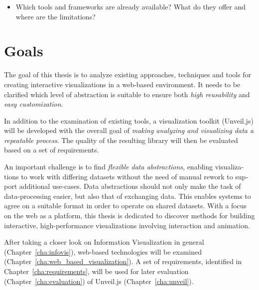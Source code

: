 \begin{english}
\begin{itemize}
  \item Which tools and frameworks are already available? What do they offer and where are the limitations?
\end{itemize}

\section{Goals}

The goal of this thesis is to analyze existing approaches, techniques and tools for creating interactive visualizations in a web-based environment. It needs to be clarified which level of abstraction is suitable to ensure both \emph{high reusability} and \emph{easy customization}. 

In addition to the examination of existing tools, a visualization toolkit (Unveil.js) will be developed with the overall goal of \emph{making analyzing and visualizing data a repeatable process}. The quality of the resulting library will then be evaluated based on a set of requirements.

An important challenge is to find \emph{flexible data abstractions}, enabling visualizations to work with differing datasets without the need of manual rework to support additional use-cases. Data abstractions should not only make the task of data-processing easier, but also that of exchanging data. This enables systems to agree on a suitable format in order to operate on shared datasets. With a focus on the web as a platform, this thesis is dedicated to discover methods for building interactive, high-performance visualizations involving interaction and animation. 

After taking a closer look on Information Visualization in general (Chapter~\ref{cha:infovis}), web-based technologies will be examined (Chapter~\ref{cha:web_based_visualization}). A set of requirements, identified in Chapter~\ref{cha:requirements}, will be used for later evaluation (Chapter~\ref{cha:evaluation}) of Unveil.js (Chapter~\ref{cha:unveil}).

\end{english}